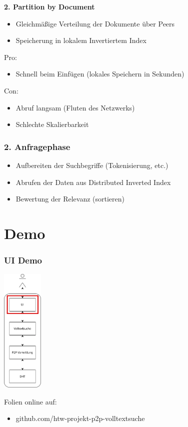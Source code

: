 \documentclass{beamer}
\begin{document}
\begin{frame}[allowframebreaks]
  \textbf{2. Partition by Document}

  \begin{itemize}
    \item Gleichmäßige Verteilung der Dokumente über Peers
    \item Speicherung in lokalem Invertiertem Index
  \end{itemize}

  \bigskip

  Pro:
  \begin{itemize}
    \item Schnell beim Einfügen (lokales Speichern in Sekunden)
  \end{itemize}
  Con:
  \begin{itemize}
    \item Abruf langsam (Fluten des Netzwerks)
    \item Schlechte Skalierbarkeit
  \end{itemize}
\end{frame}

\begin{frame}
  \frametitle{2. Anfragephase}

  \begin{itemize}
    \item Aufbereiten der Suchbegriffe (Tokenisierung, etc.)
    \item Abrufen der Daten aus Distributed Inverted Index
    \item Bewertung der Relevanz (sortieren)
  \end{itemize}
\end{frame}

\section{Demo}
\begin{frame}
  \frametitle{UI Demo}

  \begin{center}
    \includegraphics[height=6cm]{Schichten-alt-ui}
  \end{center}

  \bigskip

  {\tiny
    Folien online auf:
    \begin{itemize}
      \item github.com/htw-projekt-p2p-volltextsuche
    \end{itemize}
  }
\end{frame}
\end{document}
